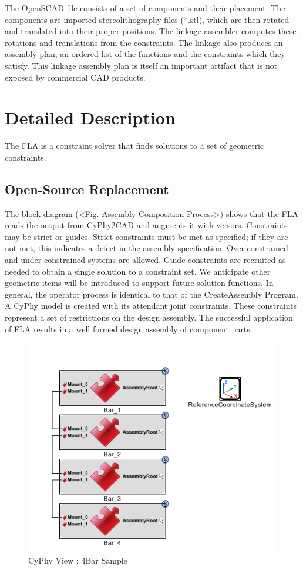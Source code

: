 \documentclass[]{report}
\begin{document}
The OpenSCAD file consists of a set of components and their placement. 
The components are imported stereolithography files (*.stl), 
which are then rotated and translated into their proper positions. 
The linkage assembler computes these rotations and translations from the constraints. 
The linkage also produces an assembly plan, an ordered list of 
the functions and the constraints which they satisfy. 
This linkage assembly plan is itself an important artifact 
that is not exposed by commercial CAD products.

\section{Detailed Description}

The FLA is a constraint solver that finds solutions to a set of geometric constraints.

\subsection{Open-Source Replacement}

The block diagram (<Fig. Assembly Composition Process>) shows that 
the FLA reads the output from CyPhy2CAD and augments it with versors. 
Constraints may be strict or guides. Strict constraints must be met as specified; 
if they are not met, this indicates a defect in the assembly specification. 
Over-constrained and under-constrained systems are allowed. 
Guide constraints are recruited as needed to obtain a single 
solution to a constraint set. We anticipate other geometric 
items will be introduced to support future solution functions. 
In general, the operator process is identical to that of the CreateAssembly Program. 
A CyPhy model is created with its attendant joint constraints. 
These constraints represent a set of restrictions on the design assembly. 
The successful application of FLA results in a well formed design assembly of component parts. 

\begin{figure}[ht!]
	\centering
	\includegraphics[scale=0.7]{images/image00.png}
	\caption{CyPhy View : 4Bar Sample}
	\label{fig:4bar-cyphy}
\end{figure}
\end{document}

